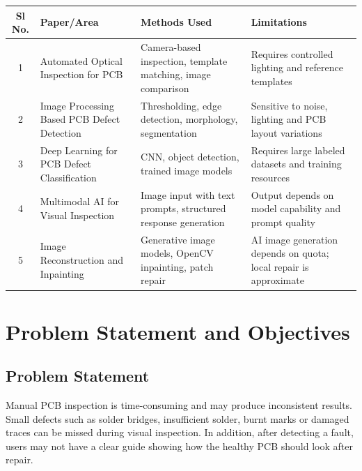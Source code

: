 \documentclass[12pt,a4paper]{report}
\begin{document}
\begin{longtable}{|c|p{4cm}|p{4cm}|p{4cm}|}

\hline
\textbf{Sl No.} & \textbf{Paper/Area} & \textbf{Methods Used} & \textbf{Limitations} \\
\hline

1 & Automated Optical Inspection for PCB & Camera-based inspection, template matching, image comparison & Requires controlled lighting and reference templates \\
\hline

2 & Image Processing Based PCB Defect Detection & Thresholding, edge detection, morphology, segmentation & Sensitive to noise, lighting and PCB layout variations \\
\hline

3 & Deep Learning for PCB Defect Classification & CNN, object detection, trained image models & Requires large labeled datasets and training resources \\
\hline

4 & Multimodal AI for Visual Inspection & Image input with text prompts, structured response generation & Output depends on model capability and prompt quality \\
\hline

5 & Image Reconstruction and Inpainting & Generative image models, OpenCV inpainting, patch repair & AI image generation depends on quota; local repair is approximate \\
\hline

\end{longtable}


\chapter{Problem Statement and Objectives}

\section{Problem Statement}

Manual PCB inspection is time-consuming and may produce inconsistent results. Small defects such as solder bridges, insufficient solder, burnt marks or damaged traces can be missed during visual inspection. In addition, after detecting a fault, users may not have a clear guide showing how the healthy PCB should look after repair.
\end{document}
